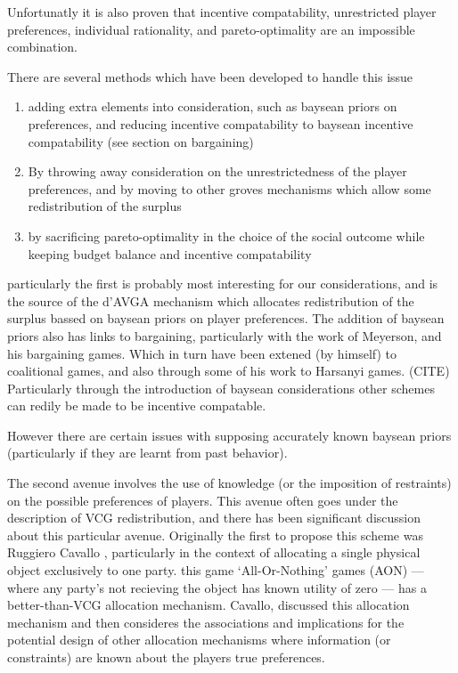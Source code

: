 Unfortunatly it is also proven that incentive compatability, unrestricted player preferences, individual rationality, and pareto-optimality are an impossible combination.

There are several methods which have been developed to handle this issue
\begin{enumerate}
    \item adding extra elements into consideration, such as baysean priors on preferences, and reducing incentive compatability to baysean incentive compatability (see section on bargaining)
    \item By throwing away consideration on the unrestrictedness of the player preferences, and by moving to other groves mechanisms which allow some redistribution of the surplus
    \item by sacrificing pareto-optimality in the choice of the social outcome while keeping budget balance and incentive compatability
\end{enumerate}

particularly the first is probably most interesting for our considerations, and is the source of the d'AVGA mechanism which allocates redistribution of the surplus bassed on baysean priors on player preferences.
The addition of baysean priors also has links to bargaining, particularly with the work of Meyerson, and his bargaining games.
Which in turn have been extened (by himself) to coalitional games, and also through some of his work to Harsanyi games. (CITE)
Particularly through the introduction of baysean considerations other schemes can redily be made to be incentive compatable.

However there are certain issues with supposing accurately known baysean priors (particularly if they are learnt from past behavior).

The second avenue involves the use of knowledge (or the imposition of restraints) on the possible preferences of players.
This avenue often goes under the description of VCG redistribution, and there has been significant discussion about this particular avenue.
Originally the first to propose this scheme was Ruggiero Cavallo \cite{Cavallo:2006:ODM:1160633.1160790}, particularly in the context of allocating a single physical object exclusively to one party.
this game `All-Or-Nothing' games (AON) --- where any party's not recieving the object has known utility of zero --- has a better-than-VCG allocation mechanism.
Cavallo, discussed this allocation mechanism and then consideres the associations and implications for the potential design of other allocation mechanisms where information (or constraints) are known about the players true preferences.

